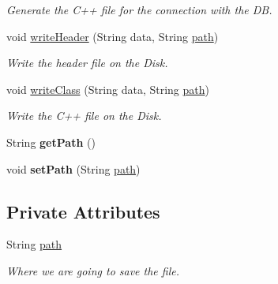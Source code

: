 \begin{DoxyCompactItemize}
\begin{DoxyCompactList}\small\item\em Generate the C++ file for the connection with the DB. \end{DoxyCompactList}\item 
void \hyperlink{class_classes_c_p_p_1_1_connection_a09fb77eb74ce9dab17b70f1f2f0b778d}{writeHeader} (String data, String \hyperlink{class_classes_c_p_p_1_1_connection_a36009c576cf538cfc00828ff5fdb079e}{path})
\begin{DoxyCompactList}\small\item\em Write the header file on the Disk. \end{DoxyCompactList}\item 
void \hyperlink{class_classes_c_p_p_1_1_connection_ad919fad2418beb85653bd1936b299e29}{writeClass} (String data, String \hyperlink{class_classes_c_p_p_1_1_connection_a36009c576cf538cfc00828ff5fdb079e}{path})
\begin{DoxyCompactList}\small\item\em Write the C++ file on the Disk. \end{DoxyCompactList}\item 
\hypertarget{class_classes_c_p_p_1_1_connection_a61622ff788e8cb6f51002ef2e7f185d0}{
String {\bfseries getPath} ()}
\label{class_classes_c_p_p_1_1_connection_a61622ff788e8cb6f51002ef2e7f185d0}

\item 
\hypertarget{class_classes_c_p_p_1_1_connection_a8d3c08fea3f44d3c4fdebe36d61f6c26}{
void {\bfseries setPath} (String \hyperlink{class_classes_c_p_p_1_1_connection_a36009c576cf538cfc00828ff5fdb079e}{path})}
\label{class_classes_c_p_p_1_1_connection_a8d3c08fea3f44d3c4fdebe36d61f6c26}

\end{DoxyCompactItemize}
\subsection*{Private Attributes}
\begin{DoxyCompactItemize}
\item 
\hypertarget{class_classes_c_p_p_1_1_connection_a36009c576cf538cfc00828ff5fdb079e}{
String \hyperlink{class_classes_c_p_p_1_1_connection_a36009c576cf538cfc00828ff5fdb079e}{path}}
\label{class_classes_c_p_p_1_1_connection_a36009c576cf538cfc00828ff5fdb079e}

\begin{DoxyCompactList}\small\item\em Where we are going to save the file. \end{DoxyCompactList}\end{DoxyCompactItemize}


